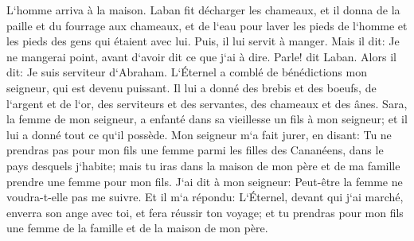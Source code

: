 \verse L`homme arriva à la maison. Laban fit décharger les chameaux, et il donna de la paille et du fourrage aux chameaux, et de l`eau pour laver les pieds de l`homme et les pieds des gens qui étaient avec lui. 
\verse Puis, il lui servit à manger. Mais il dit: Je ne mangerai point, avant d`avoir dit ce que j`ai à dire. Parle! dit Laban. 
\verse Alors il dit: Je suis serviteur d`Abraham. 
\verse L`Éternel a comblé de bénédictions mon seigneur, qui est devenu puissant. Il lui a donné des brebis et des boeufs, de l`argent et de l`or, des serviteurs et des servantes, des chameaux et des ânes. 
\verse Sara, la femme de mon seigneur, a enfanté dans sa vieillesse un fils à mon seigneur; et il lui a donné tout ce qu`il possède. 
\verse Mon seigneur m`a fait jurer, en disant: Tu ne prendras pas pour mon fils une femme parmi les filles des Cananéens, dans le pays desquels j`habite; 
\verse mais tu iras dans la maison de mon père et de ma famille prendre une femme pour mon fils. 
\verse J`ai dit à mon seigneur: Peut-être la femme ne voudra-t-elle pas me suivre. 
\verse Et il m`a répondu: L`Éternel, devant qui j`ai marché, enverra son ange avec toi, et fera réussir ton voyage; et tu prendras pour mon fils une femme de la famille et de la maison de mon père. 
